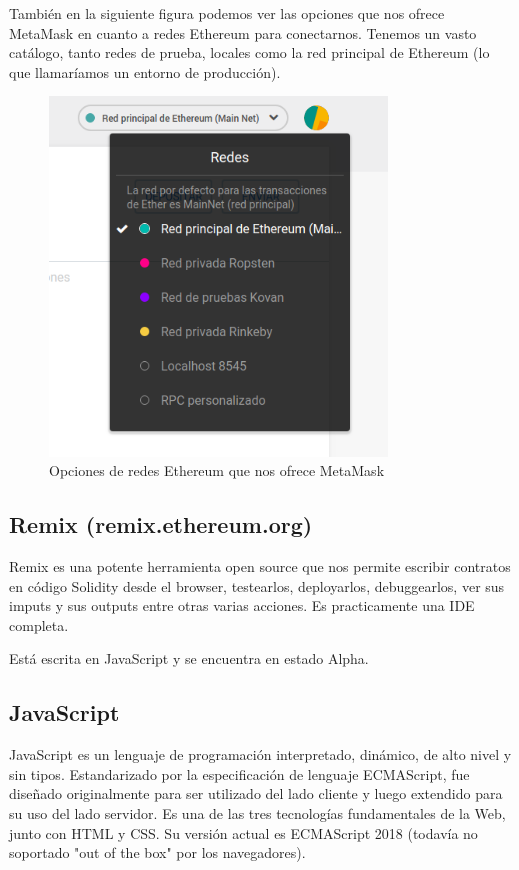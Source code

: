 También en la siguiente figura podemos ver las opciones que nos ofrece MetaMask en cuanto 
a redes Ethereum para conectarnos. Tenemos un vasto catálogo, tanto redes de prueba, locales
como la red principal de Ethereum (lo que llamaríamos un entorno de producción).

\begin{figure}[htbp!] 
\centering    
\includegraphics[width=0.8\textwidth]{metamask-networks}
\caption[MetaMaskNetworks]{Opciones de redes Ethereum que nos ofrece MetaMask}
\label{fig:metamask-networks}
\end{figure}

\subsection{Remix (remix.ethereum.org)}
Remix es una potente herramienta open source que nos permite escribir contratos en código
Solidity desde el browser, testearlos, deployarlos, debuggearlos, ver sus imputs y sus outputs
entre otras varias acciones. Es practicamente una IDE completa.

Está escrita en JavaScript y se encuentra en estado Alpha.

\subsection{JavaScript}
JavaScript es un lenguaje de programación interpretado, dinámico, de alto nivel y sin
tipos. Estandarizado por la especificación de lenguaje ECMAScript, fue diseñado originalmente para
ser utilizado del lado cliente y luego extendido para su uso del lado servidor. Es una de las tres
tecnologías fundamentales de la Web, junto con HTML y CSS. Su versión actual es ECMAScript 2018
(todavía no soportado "out of the box" por los navegadores).


